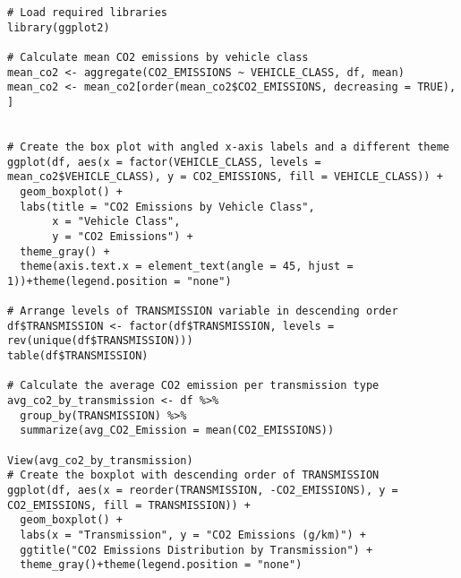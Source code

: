 \documentclass[12pt, a4paper,oneside]{book}
\numberwithin{equation}{section}
\begin{document}
\begin{lstlisting}
# Load required libraries
library(ggplot2)

# Calculate mean CO2 emissions by vehicle class
mean_co2 <- aggregate(CO2_EMISSIONS ~ VEHICLE_CLASS, df, mean)
mean_co2 <- mean_co2[order(mean_co2$CO2_EMISSIONS, decreasing = TRUE), ]


# Create the box plot with angled x-axis labels and a different theme
ggplot(df, aes(x = factor(VEHICLE_CLASS, levels = mean_co2$VEHICLE_CLASS), y = CO2_EMISSIONS, fill = VEHICLE_CLASS)) +
  geom_boxplot() +
  labs(title = "CO2 Emissions by Vehicle Class",
       x = "Vehicle Class",
       y = "CO2 Emissions") +
  theme_gray() +
  theme(axis.text.x = element_text(angle = 45, hjust = 1))+theme(legend.position = "none")

# Arrange levels of TRANSMISSION variable in descending order
df$TRANSMISSION <- factor(df$TRANSMISSION, levels = rev(unique(df$TRANSMISSION)))
table(df$TRANSMISSION)

# Calculate the average CO2 emission per transmission type
avg_co2_by_transmission <- df %>%
  group_by(TRANSMISSION) %>%
  summarize(avg_CO2_Emission = mean(CO2_EMISSIONS))

View(avg_co2_by_transmission)
# Create the boxplot with descending order of TRANSMISSION
ggplot(df, aes(x = reorder(TRANSMISSION, -CO2_EMISSIONS), y = CO2_EMISSIONS, fill = TRANSMISSION)) +
  geom_boxplot() +
  labs(x = "Transmission", y = "CO2 Emissions (g/km)") +
  ggtitle("CO2 Emissions Distribution by Transmission") +
  theme_gray()+theme(legend.position = "none")


\end{lstlisting}
\end{document}
